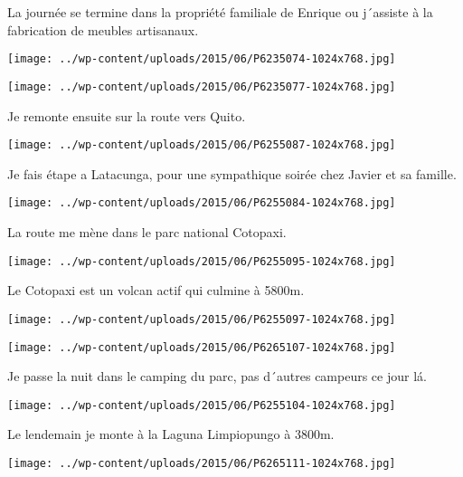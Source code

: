  La journée se termine dans la propriété familiale de Enrique ou j´assiste à la fabrication de meubles artisanaux. \newline
 \newline
\centerline{\texttt{[image: ../wp-content/uploads/2015/06/P6235074-1024x768.jpg]} } 
 \newline
 \newline
\centerline{\texttt{[image: ../wp-content/uploads/2015/06/P6235077-1024x768.jpg]} } 
 \newline
 Je remonte ensuite sur la route vers Quito. \newline
 \newline
\centerline{\texttt{[image: ../wp-content/uploads/2015/06/P6255087-1024x768.jpg]} } 
 \newline
 Je fais étape a Latacunga, pour une sympathique soirée chez Javier et sa famille. \newline
 \newline
\centerline{\texttt{[image: ../wp-content/uploads/2015/06/P6255084-1024x768.jpg]} } 
 \newline
 La route me mène dans le parc national Cotopaxi. \newline
 \newline
\centerline{\texttt{[image: ../wp-content/uploads/2015/06/P6255095-1024x768.jpg]} } 
 \newline
 Le Cotopaxi est un volcan actif qui culmine à 5800m. \newline
 \newline
\centerline{\texttt{[image: ../wp-content/uploads/2015/06/P6255097-1024x768.jpg]} } 
 \newline
 \newline
\centerline{\texttt{[image: ../wp-content/uploads/2015/06/P6265107-1024x768.jpg]} } 
 \newline
 Je passe la nuit dans le camping du parc, pas d´autres campeurs ce jour lá. \newline
 \newline
\centerline{\texttt{[image: ../wp-content/uploads/2015/06/P6255104-1024x768.jpg]} } 
 \newline
 Le lendemain je monte à la Laguna Limpiopungo à 3800m. \newline
 \newline
\centerline{\texttt{[image: ../wp-content/uploads/2015/06/P6265111-1024x768.jpg]} } 
 \newline
